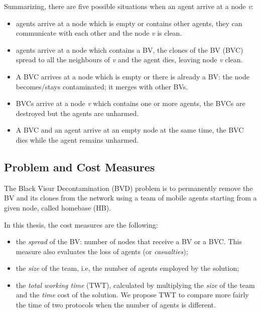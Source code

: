 Summarizing, there are five possible situations when an agent arrive at a node {\em v}:
\begin{itemize}
\item agents arrive at a node which is empty or contains other agents, they can communicate with each other and the node {\em v} is clean.
\item agents arrive at a node which contains a BV, the clones of the BV (BVC) spread to all the neighbours of {\em v} and the agent dies, leaving node {\em v} clean.
\item A BVC arrives at a node which is empty or there is already a BV: the node becomes/stays contaminated; it merges with other BVs.
\item BVCs arrive at a node {\em v} which contains one or more agents, the BVCs are destroyed but the agents are unharmed.
\item A BVC and an agent arrive at an empty node at the same time, the BVC dies while the agent remains unharmed. 
\end{itemize}

\subsection{Problem and Cost Measures}
The {\sc Black Visur Decontamination}  (BVD) problem is to permanently remove the BV  and its clones from the network using a team of mobile agents starting from a given node, called homebase (HB). 

In this thesis, the cost measures  are the following: 
\begin{itemize}
\item the {\em spread} of the BV: number of nodes that receive a BV or a BVC. This measure also evaluates the loss of   agents (or {\em casualties});
\item  the {\em size} of the team, i.e, the number of agents employed by the solution; 
\item the {\em total working time} (TWT), calculated by multiplying the {\em size} of the team and the {\em time} cost of  the solution. 
We propose TWT to compare more fairly the time of two protocols when the number of agents is different.
\end{itemize}


